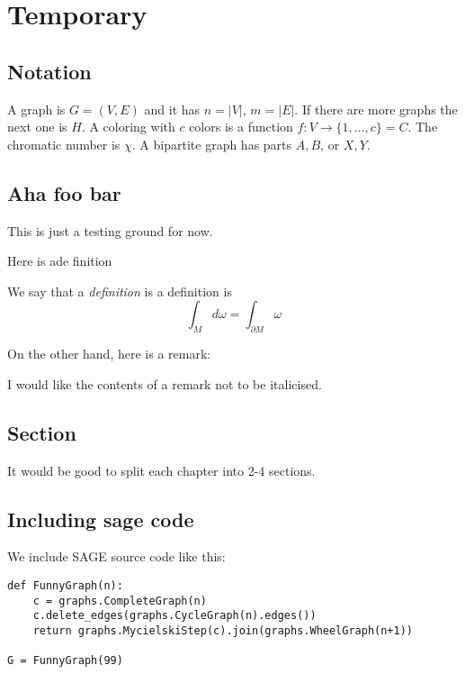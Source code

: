\chapter{Temporary}

\section{Notation}

A graph is $G=(V,E)$ and it has $n=|V|$, $m=|E|$. If there are more graphs the next one is $H$. A coloring with $c$ colors is a function $f:V\to \{1,\ldots,c\}=C$. The chromatic number is $\chi$. A bipartite graph has parts $A,B$, or $X,Y$.


\section{Aha foo bar}
This is just a testing ground for now.

Here is ade finition

\begin{definition} We say that a \emph{definition} is a definition is
\begin{equation}
\label{eq:def-eq-temp}
\int_M d\omega = \int_{\partial M} \omega
\end{equation}
\end{definition}

On the other hand, here is a remark:

\begin{remark}
I would like the contents of a remark not to be italicised.
\end{remark}

\section{Section}
It would be good to split each chapter into 2-4 sections.

\section{Including sage code}
We include SAGE source code like this:

\begin{verbatim}
def FunnyGraph(n):
    c = graphs.CompleteGraph(n)
    c.delete_edges(graphs.CycleGraph(n).edges())
    return graphs.MycielskiStep(c).join(graphs.WheelGraph(n+1))

G = FunnyGraph(99)
\end{verbatim}

